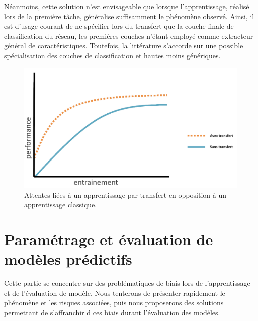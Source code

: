 Néanmoins, cette solution n’est envisageable que lorsque l’apprentissage, réalisé lors de la première tâche, généralise suffisamment le phénomène observé. Ainsi, il est d’usage courant de ne spécifier lors du transfert que la couche finale de classification du réseau, les premières couches n’étant employé comme extracteur général de caractéristiques. Toutefois, la littérature s’accorde sur une possible spécialisation des couches de classification et hautes moins génériques.\par

\begin{figure}[H]
    \centering
    \includegraphics[width=\linewidth]{contents/chapter_3/resources/example_learning_curves.pdf}
    \caption{ Attentes liées à un apprentissage par transfert en opposition à un apprentissage classique.}
    \label{fig:learning_curves}
\end{figure}

\clearpage

\section{Paramétrage et évaluation de modèles prédictifs}
\label{sec:models_settings}
Cette partie se concentre sur des problématiques de biais lors de l'apprentissage et de l'évaluation de modèle. Nous tenterons de présenter rapidement le phénomène et les risques associées, puis nous proposerons des solutions permettant de s'affranchir d ces biais durant l'évaluation des modèles.\par

